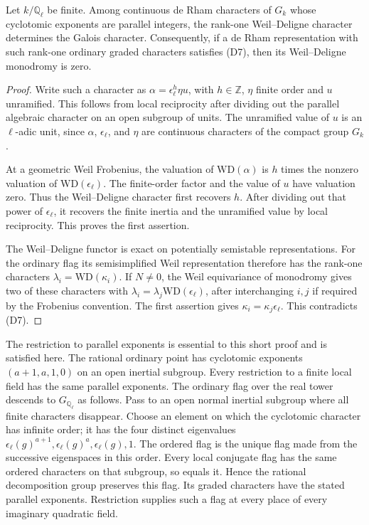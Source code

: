 \begin{srlemma}\label{lem:sr-parallel-wd-characters}
Let \(k/\mathbb Q_\ell\) be finite.
Among continuous de Rham characters of \(G_k\)
whose cyclotomic exponents are parallel integers,
the rank-one Weil--Deligne character determines the
Galois character.
Consequently, if a de Rham representation with such
rank-one ordinary graded characters satisfies (D7),
then its Weil--Deligne monodromy is zero.
\end{srlemma}
\begin{proof}
Write such a character as
\(\alpha=\epsilon_\ell^h\eta u\), with \(h\in\mathbb Z\),
\(\eta\) finite order and \(u\) unramified.
This follows from local reciprocity after dividing out
the parallel algebraic character on an open subgroup
of units.
The unramified value of \(u\) is an \(\ell\)-adic unit,
since \(\alpha\), \(\epsilon_\ell\), and \(\eta\)
are continuous characters of the compact group \(G_k\).

At a geometric Weil Frobenius, the valuation of
\(\mathrm{WD}(\alpha)\) is \(h\) times the nonzero
valuation of \(\mathrm{WD}(\epsilon_\ell)\).
The finite-order factor and the value of \(u\)
have valuation zero.
Thus the Weil--Deligne character first recovers \(h\).
After dividing out that power of \(\epsilon_\ell\),
it recovers the finite inertia and the unramified
value by local reciprocity.
This proves the first assertion.

The Weil--Deligne functor is exact on potentially
semistable representations.
For the ordinary flag its semisimplified Weil
representation therefore has the rank-one characters
\(\lambda_i=\mathrm{WD}(\kappa_i)\).
If \(N\ne0\), the Weil equivariance of monodromy
gives two of these characters with
\(\lambda_i=\lambda_j\mathrm{WD}(\epsilon_\ell)\),
after interchanging \(i,j\) if required by the
Frobenius convention.
The first assertion gives
\(\kappa_i=\kappa_j\epsilon_\ell\).
This contradicts (D7).
\end{proof}

The restriction to parallel exponents is essential to this
short proof and is satisfied here.
The rational ordinary point has cyclotomic exponents
\((a+1,a,1,0)\) on an open inertial subgroup.
Every restriction to a finite local field has the same
parallel exponents.
The ordinary flag over the real tower descends to
\(G_{\mathbb Q_\ell}\) as follows.
Pass to an open normal inertial subgroup where all finite
characters disappear.
Choose an element on which the cyclotomic character has
infinite order; it has the four distinct eigenvalues
\(\epsilon_\ell(g)^{a+1},
  \epsilon_\ell(g)^a,\epsilon_\ell(g),1\).
The ordered flag is the unique flag made from the
successive eigenspaces in this order.
Every local conjugate flag has the same ordered
characters on that subgroup, so equals it.
Hence the rational decomposition group preserves this
flag. Its graded characters have the stated parallel
exponents.
Restriction supplies such a flag at every place of every
imaginary quadratic field.

